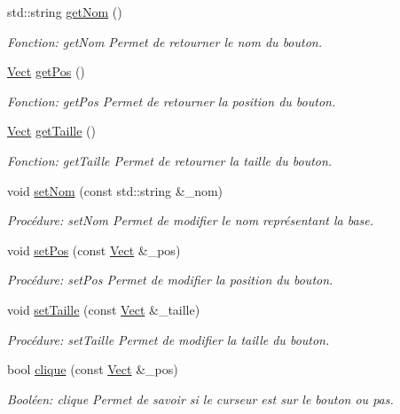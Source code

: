 \begin{DoxyCompactItemize}
std\+::string \hyperlink{classBouton_a84818c161e6ea4ee6d58ccc53d57d802}{get\+Nom} ()
\begin{DoxyCompactList}\small\item\em Fonction\+: get\+Nom Permet de retourner le nom du bouton. \end{DoxyCompactList}\item 
\hyperlink{classVect}{Vect} \hyperlink{classBouton_a98c3ba829a653f51ef8079395bbe061c}{get\+Pos} ()
\begin{DoxyCompactList}\small\item\em Fonction\+: get\+Pos Permet de retourner la position du bouton. \end{DoxyCompactList}\item 
\hyperlink{classVect}{Vect} \hyperlink{classBouton_af8d5683f32e115bd8d709bbfd6965b54}{get\+Taille} ()
\begin{DoxyCompactList}\small\item\em Fonction\+: get\+Taille Permet de retourner la taille du bouton. \end{DoxyCompactList}\item 
void \hyperlink{classBouton_a4bdd74233fa0a3f6fe67d463b75d3f4a}{set\+Nom} (const std\+::string \&\+\_\+nom)
\begin{DoxyCompactList}\small\item\em Procédure\+: set\+Nom Permet de modifier le nom représentant la base. \end{DoxyCompactList}\item 
void \hyperlink{classBouton_a393e195ff7d1ff7a5d3c79edc922b0cd}{set\+Pos} (const \hyperlink{classVect}{Vect} \&\+\_\+pos)
\begin{DoxyCompactList}\small\item\em Procédure\+: set\+Pos Permet de modifier la position du bouton. \end{DoxyCompactList}\item 
void \hyperlink{classBouton_a972600e88d0a65431c27bec898fbba36}{set\+Taille} (const \hyperlink{classVect}{Vect} \&\+\_\+taille)
\begin{DoxyCompactList}\small\item\em Procédure\+: set\+Taille Permet de modifier la taille du bouton. \end{DoxyCompactList}\item 
bool \hyperlink{classBouton_a3a5187a073d75fb8afc44704908d5117}{clique} (const \hyperlink{classVect}{Vect} \&\+\_\+pos)
\begin{DoxyCompactList}\small\item\em Booléen\+: clique Permet de savoir si le curseur est sur le bouton ou pas. \end{DoxyCompactList}\end{DoxyCompactItemize}


